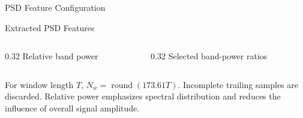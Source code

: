 \documentclass{beamer}
\begin{document}
\begin{frame}{PSD Feature Configuration}
\begin{block}{Extracted PSD Features}
\begin{columns}[T,onlytextwidth]
      \begin{column}{0.32\textwidth}
        \centering
        Relative band power
      \end{column}

      \begin{column}{0.32\textwidth}
        \centering
        Selected band-power ratios
      \end{column}
    \end{columns}
  \end{block}

  \vspace{0.05cm}

  {\scriptsize
  For window length $T$,
  $N_w=\operatorname{round}(173.61T)$.
  Incomplete trailing samples are discarded.
  Relative power emphasizes spectral distribution and reduces the
  influence of overall signal amplitude.
  }

\end{frame}
\end{document}
